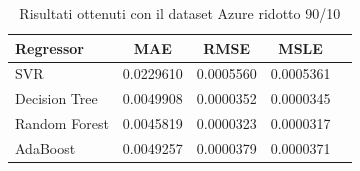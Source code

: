\begin{table}[H]
    \centering
    \begin{tabular}{|>{\centering\arraybackslash}m{5cm}|c|c|c|c|}
        \hline
        \textbf{Regressor} & \textbf{MAE} & \textbf{RMSE} & \textbf{MSLE} \\ [10pt]
        \hline
        SVR & 0.0229610 & 0.0005560 & 0.0005361 \\ [10pt]
        \hline
        Decision Tree & 0.0049908 & 0.0000352 & 0.0000345 \\ [10pt]
        \hline
        Random Forest & 0.0045819 & 0.0000323 & 0.0000317 \\ [10pt]
        \hline
        AdaBoost & 0.0049257 & 0.0000379 & 0.0000371 \\ [10pt]
        \hline
    \end{tabular}
    \caption{Risultati ottenuti con il dataset Azure ridotto 90/10}
    \label{tab:results}
\end{table}


